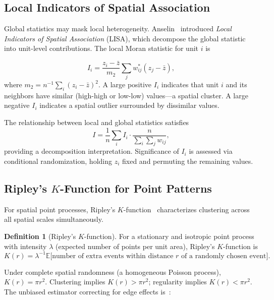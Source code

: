 \documentclass[conference]{IEEEtran}
\theoremstyle{definition}
\newtheorem{definition}{Definition}
\begin{document}
\subsection{Local Indicators of Spatial Association}

Global statistics may mask local heterogeneity. Anselin~\cite{anselin1995} introduced \emph{Local Indicators of Spatial Association} (LISA), which decompose the global statistic into unit-level contributions. The local Moran statistic for unit $i$ is

\begin{equation}
I_i = \frac{z_i - \bar{z}}{m_2} \sum_{j} w_{ij}^*(z_j - \bar{z}),
\label{eq:local_moran}
\end{equation}
where $m_2 = n^{-1}\sum_i (z_i - \bar{z})^2$. A large positive $I_i$ indicates that unit $i$ and its neighbors have similar (high-high or low-low) values---a spatial cluster. A large negative $I_i$ indicates a spatial outlier surrounded by dissimilar values.

The relationship between local and global statistics satisfies
\begin{equation}
I = \frac{1}{n}\sum_i I_i \cdot \frac{n}{\sum_{i}\sum_{j}w_{ij}},
\end{equation}
providing a decomposition interpretation. Significance of $I_i$ is assessed via conditional randomization, holding $z_i$ fixed and permuting the remaining values.

\subsection{Ripley's $K$-Function for Point Patterns}

For spatial point processes, Ripley's $K$-function~\cite{ripley1976} characterizes clustering across all spatial scales simultaneously.

\begin{definition}[Ripley's $K$-function]
For a stationary and isotropic point process with intensity $\lambda$ (expected number of points per unit area), Ripley's $K$-function is
\[
K(r) = \lambda^{-1} \mathbb{E}\bigl[\text{number of extra events within distance } r \text{ of a randomly chosen event}\bigr].
\]
\end{definition}

Under complete spatial randomness (a homogeneous Poisson process), $K(r) = \pi r^2$. Clustering implies $K(r) > \pi r^2$; regularity implies $K(r) < \pi r^2$. The unbiased estimator correcting for edge effects is~\cite{ripley1988}:
\end{document}
